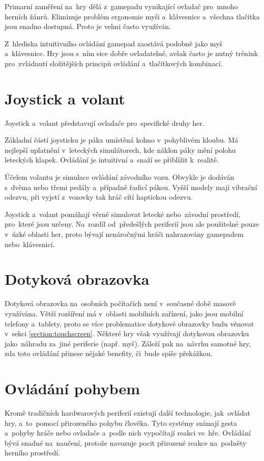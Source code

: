 \documentclass[thesis=B,czech,hidelinks]{FITthesis}[2012/06/26] %
\begin{document}
Primarní zaměření na~hry dělá z~gamepadu vynikající ovladač pro~mnoho herních žánrů. Eliminuje problém ergonomie myši a~klávesnice a~všechna tlačítka jsou snadno dostupná. Proto je velmi často využíván.

Z~hlediska intuitivního ovládání gamepad zaostává podobně jako myš a~klávesnice. Hry jsou s~ním sice dobře ovladatelné, avšak často je nutný trénink pro~zvládnutí složitějších principů ovládání a~tlačítkových kombinací.

\section{Joystick a volant}

Joystick a~volant představují ovladače pro~specifické druhy her.

Základní částí joysticku je páka umístěná kolmo v~pohyblivém kloubu. Má nejlepší uplatnění v~leteckých simulátorech, kde náklon páky mění polohu leteckých klapek. Ovládání je intuitivní a~snaží se přiblížit k~realitě.

Účelem volantu je simulace ovládání závodního vozu. Obvykle je dodáván s~dvěma nebo třemi pedály a~případně řadicí pákou. Vyšší modely mají vibrační odezvu, při vyjetí z~vozovky tak hráč cítí haptickou odezvu.

Joystick a~volant pomáhají věrně simulovat letecké nebo~závodní prostředí, pro~které jsou určeny. Na~rozdíl od~předešlých periferií jsou ale použitelné pouze v~úzké oblasti her, proto bývají nenáročnými hráči nahrazovány gamepadem nebo~klávesnicí.

\section{Dotyková obrazovka}

Dotyková obrazovka na~osobních počítačích není v~současné době masově využívána. Větší rozšíření má v~oblasti mobilních zařízení, jako jsou mobilní telefony a~tablety, proto se více problematice dotykové obrazovky budu věnovat v~sekci \ref{section:touchscreen}. Některé hry však využívají dotykovou obrazovku jako~náhradu za~jiné periferie (např. myš). Záleží pak na~návrhu samotné hry, zda toto ovládání přinese nějaké benefity, či~bude spíše překážkou.

\section{Ovládání pohybem}

Kromě tradičních hardwarových periferií existují další technologie, jak~ovládat hry, a~to~pomocí přirozeného pohybu člověka. Tyto systémy snímají gesta a~pohyby hráče nebo ovladače a~podle nich vypočítají reakci ve~hře. Ovládání bývá snadné na~naučení, protože navozuje pocit přirozené reakce na~podněty herního prostředí.
\end{document}
